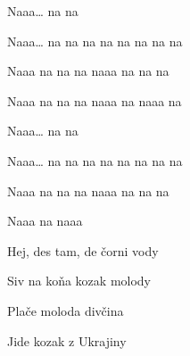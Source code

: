 \begin{song}
\bigskip

\Refren

\bigskip


 \par
{}Naaa…   na na \par
{}Naaa… na na na na na na na na \par
{}Naaa na na na naaa na na na \par
{}Naaa na na na naaa na naaa na \par

\bigskip

Naaa…   na na \par
{}Naaa… na na na na na na na na \par
{}Naaa na na na naaa na na na \par
{}Naaa na naaa  \par

\bigskip



 \par
{}Hej, des tam, de čorni vody \par
{}Siv na koňa kozak molody \par
{}Plače moloda divčina \par
{}Jide kozak z Ukrajiny \par

\bigskip

\Refren

\end{song}
